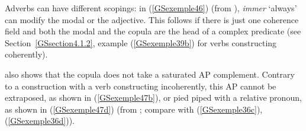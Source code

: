 \eal 
	\label{GSexemple45} 
    \label{GSexemple45a}

	\label{GSexemple45b}
\zl

Adverbs can have different scopings: in (\ref{GSexemple46}) (from \citealt[68]{Mueller2002b}),
\emph{immer} `always' can modify the modal or the adjective. This follows if there is just one
coherence field and both the modal and the copula are the head of a complex predicate (see
Section~\ref{GSsection4.1.2}, example (\ref{GSexemple39b}) for verbs constructing coherently).

\z

\citet{Mueller2002b} also shows that the copula does not take a saturated AP complement. Contrary to a construction with a verb constructing incoherently, this AP cannot be extraposed, as shown in (\ref{GSexemple47b}), or pied piped with a relative pronoun, as shown in (\ref{GSexemple47d}) (from \citealt[70]{Mueller2002b}; compare with (\ref{GSexemple36c}), (\ref{GSexemple36d})).   

\eal
	\label{GSexemple47} 
	\label{GSexemple47a}

	\label{GSexemple47b}
 
